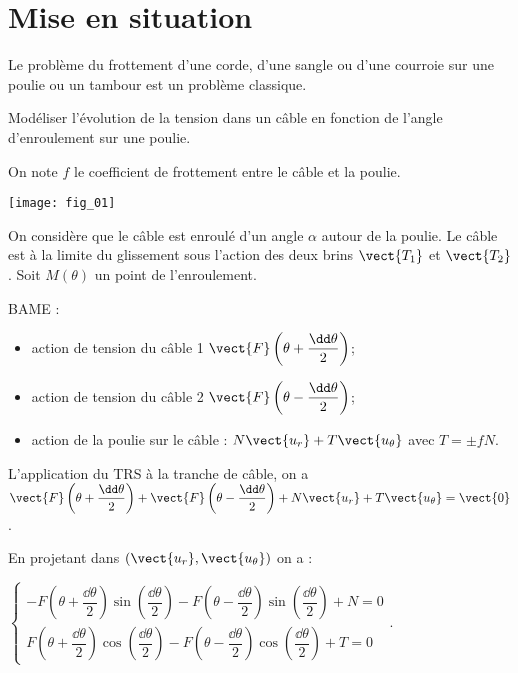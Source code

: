 \section*{Mise en situation}
\ifprof
\else
\fi

Le problème du frottement d'une corde, d'une sangle ou d'une courroie sur une poulie ou
un tambour est un problème classique. 
\begin{obj}
Modéliser l'évolution de la tension dans un câble en fonction de l'angle d'enroulement sur une poulie. 
\end{obj}

On note $f$ le coefficient de frottement entre le câble et la poulie. 
\begin{center}
\texttt{[image: fig\_01]}
\end{center}

On considère que le câble est enroulé d'un angle $\alpha$ autour de la poulie. Le câble est à la limite du glissement sous l'action des deux brins $\vect{T_1}$ et $\vect{T_2}$. Soit $M(\theta)$ un point de l'enroulement. 

\ifprof
\begin{corrige}
BAME :
\begin{itemize}
\item action de tension du câble 1 $\vect{F}\left(\theta+\dfrac{\dd \theta}{2}\right)$;
\item action de tension du câble 2 $\vect{F}\left(\theta-\dfrac{\dd \theta}{2}\right)$;
\item action de la poulie sur le câble : $N\vect{u_r}+T\vect{u_{\theta}}$ avec $T=\pm fN$.
\end{itemize}

\end{corrige}
\else
\fi


\ifprof
\begin{corrige}
L'application du TRS à la tranche de câble, on a $\vect{F}\left(\theta+\dfrac{\dd \theta}{2}\right) + \vect{F}\left(\theta-\dfrac{\dd \theta}{2}\right) + N\vect{u_r}+T\vect{u_{\theta}} = \vect{0}$.

En projetant dans $\left( \vect{u_r}, \vect{u_{\theta}}\right)$ on a :
 
$\left\{ 
\begin{array}{l}
-F\left(\theta+\dfrac{\dd \theta}{2}\right)  \sin\left(\dfrac{\dd \theta}{2}\right)  -F\left(\theta-\dfrac{\dd \theta}{2}\right) \sin\left(\dfrac{\dd \theta}{2}\right) + N= 0 \\
F\left(\theta+\dfrac{\dd \theta}{2}\right) \cos\left(\dfrac{\dd \theta}{2}\right) -F\left(\theta-\dfrac{\dd \theta}{2}\right) \cos\left(\dfrac{\dd \theta}{2}\right) + T = 0
\end{array}
\right.$.

\end{corrige}
\else
\fi


